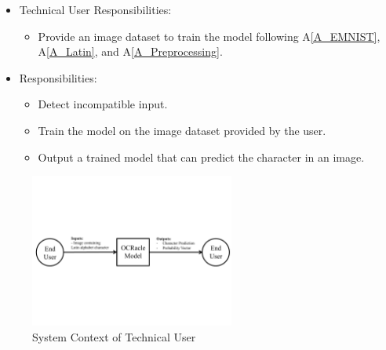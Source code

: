 \documentclass[12pt]{article}
\begin{document}
\begin{itemize}
  \item Technical User Responsibilities:
  \begin{itemize}
  \item Provide an image dataset to train the model following A\ref{A_EMNIST}, A\ref{A_Latin}, and A\ref{A_Preprocessing}.
  \end{itemize}
  \item \progname{} Responsibilities:
  \begin{itemize}
  \item Detect incompatible input.
  \item Train the model on the image dataset provided by the user.
  \item Output a trained model that can predict the character in an image.
  \end{itemize}
  \end{itemize}

\begin{figure}[h!]
  \begin{center}
    \includegraphics[page=1, width=0.6\textwidth]{SystemContextFigure}
    \caption{System Context of Technical User}
    \label{Fig_SystemContext1} 
  \end{center}
\end{figure}

\end{document}
